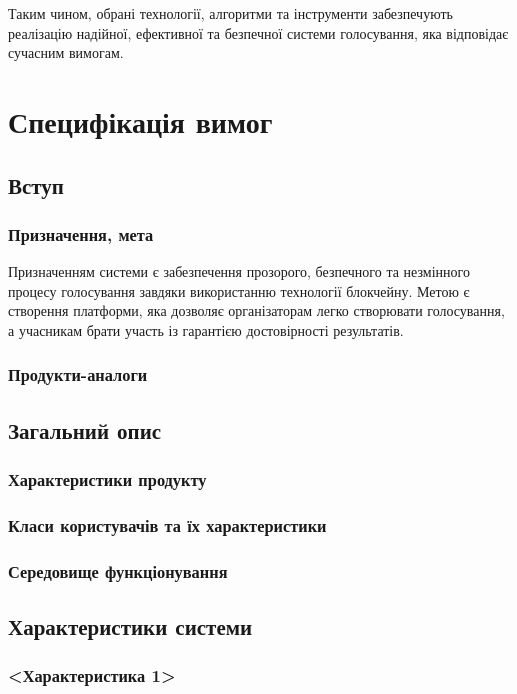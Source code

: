 \documentclass[14pt]{extreport}
\begin{document}
  Таким чином, обрані технології, алгоритми та інструменти забезпечують реалізацію надійної, ефективної та безпечної системи голосування, яка відповідає сучасним вимогам.
  
  \section{Специфікація вимог}  
  \subsection{Вступ}
  \subsubsection{Призначення, мета}
  Призначенням системи є забезпечення прозорого, безпечного та незмінного процесу голосування завдяки використанню технології блокчейну. Метою є створення платформи, яка дозволяє організаторам легко створювати голосування, а учасникам брати участь із гарантією достовірності результатів.
  
  \subsubsection{Продукти-аналоги}
  
  \subsection{Загальний опис}
  \subsubsection{Характеристики продукту}  
  \subsubsection{Класи користувачів та їх характеристики}
  \subsubsection{Середовище функціонування}

  \subsection{Характеристики системи}
  \subsubsection{<Характеристика 1>}
\end{document}
